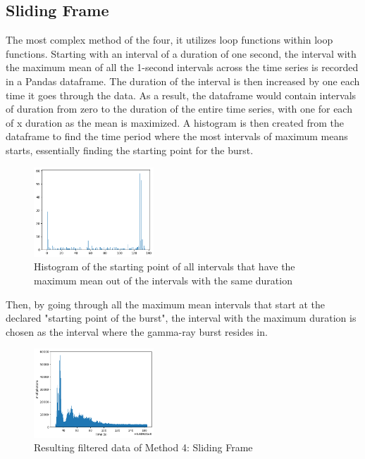 \documentclass[final,5p,times,twocolumn,authoryear]{elsarticle}
\begin{document}
\subsection{Sliding Frame}
The most complex method of the four, it utilizes loop functions within loop functions. Starting with an interval of a duration of one second, the interval with the maximum mean of all the 1-second intervals across the time series is recorded in a Pandas dataframe. The duration of the interval is then increased by one each time it goes through the data. As a result, the dataframe would contain intervals of duration from zero to the duration of the entire time series, with one for each of x duration as the mean is maximized. A histogram is then created from the dataframe to find the time period where the most intervals of maximum means starts, essentially finding the starting point for the burst.
\begin{figure}[H]
	\centering 
	\includegraphics[width=0.4\textwidth]{images/SlidingFrameHist.png}	
	\caption{Histogram of the starting point of all intervals that have the maximum mean out of the intervals with the same duration} 
	\label{fig_mom0}%
\end{figure}
Then, by going through all the maximum mean intervals that start at the declared "starting point of the burst", the interval with the maximum duration is chosen as the interval where the gamma-ray burst resides in.
\begin{figure}[H]
	\centering 
	\includegraphics[width=0.4\textwidth]{images/SlidingFrame.png}	
	\caption{Resulting filtered data of Method 4: Sliding Frame} 
	\label{fig_mom0}%
\end{figure}
\end{document}

